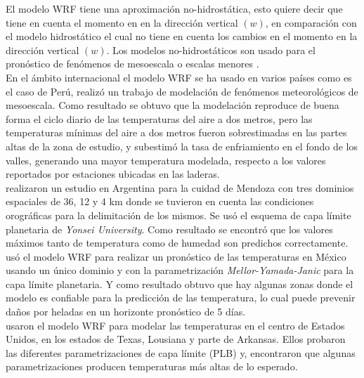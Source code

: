 El modelo WRF tiene una aproximación no-hidrostática, esto quiere decir que tiene en cuenta el momento en en la dirección vertical $(w)$, en comparación con el modelo hidrostático el cual no tiene en cuenta los cambios en el momento en la dirección vertical $(w)$. Los modelos no-hidrostáticos son usado para el pronóstico de fenómenos de mesoescala o escalas menores \citep{Pielke2002, Sene2010}.\\

En el ámbito internacional el modelo WRF se ha usado en varios países como es el caso de Perú, \citet{Saavedra2016} realizó un trabajo de modelación de fenómenos meteorológicos de mesoescala. Como resultado se obtuvo que la modelación reproduce de buena forma el ciclo diario de las temperaturas del aire a dos metros, pero las temperaturas mínimas del aire a dos metros fueron sobrestimadas en las partes altas de la zona de estudio, y subestimó la tasa de enfriamiento en el fondo de los valles, generando una mayor temperatura modelada, respecto a los valores reportados por estaciones ubicadas en las laderas.\\

\citet{Fernandez2011} realizaron un estudio en Argentina para la cuidad de Mendoza con tres dominios espaciales de 36, 12 y 4 km donde se tuvieron en cuenta las condiciones orográficas para la delimitación de los mismos. Se usó el esquema de capa límite planetaria de \textit{Yonsei University}. Como resultado se encontró que los valores máximos tanto de temperatura como de humedad son predichos correctamente.\\

\citet{Corrales2015a} usó el modelo WRF para realizar un pronóstico de las temperaturas en México usando un único dominio y con la parametrización \textit{Mellor-Yamada-Janic} para la capa límite planetaria. Y como resultado obtuvo que hay algunas zonas donde el modelo es confiable para la predicción de las temperatura, lo cual puede prevenir daños por heladas en un horizonte pronóstico de 5 días.\\

\citet{Hu2010} usaron el modelo WRF para modelar las temperaturas en el centro de Estados Unidos, en los estados de Texas, Lousiana y parte de Arkansas. Ellos probaron las diferentes parametrizaciones de capa límite (PLB) y, encontraron que algunas parametrizaciones producen temperaturas más altas de lo esperado.\\

